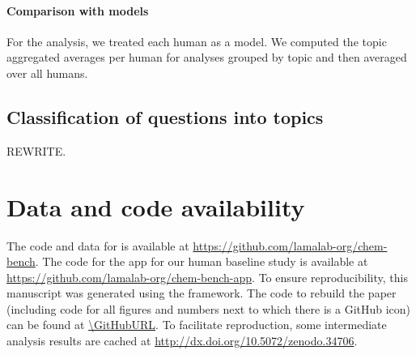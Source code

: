 \documentclass[11pt, oneside]{article}
\begin{document}
\begin{refsection}
\paragraph{Comparison with models}
For the analysis, we treated each human as a model. We computed the topic aggregated averages per human for analyses grouped by topic and then averaged over all humans.

\subsection{Classification of questions into topics}\label{sec:meth-topic} 

REWRITE. 

\section*{Data and code availability}
The code and data for \chembench is available at \url{https://github.com/lamalab-org/chem-bench}.
The code for the app for our human baseline study is available at \url{https://github.com/lamalab-org/chem-bench-app}. 
To ensure reproducibility, this manuscript was generated using the \href{https://show-your.work/en/latest/}{\showyourwork} framework.\autocite{Luger2021}
The code to rebuild the paper (including code for all figures and numbers next to which there is a GitHub icon) can be found at \url{\GitHubURL}. 
To facilitate reproduction, some intermediate analysis results are cached at \url{http://dx.doi.org/10.5072/zenodo.34706}.


\end{refsection}
\end{document}
